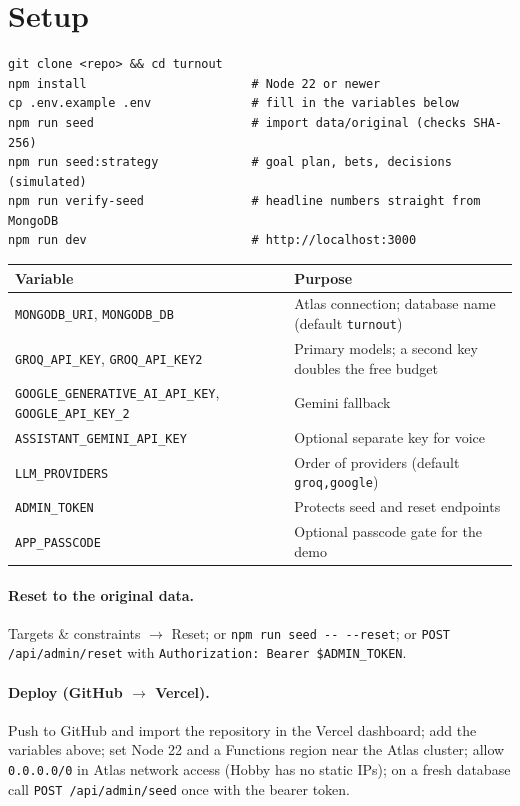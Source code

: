 \documentclass[11pt,a4paper]{article}
\newcommand{\code}[1]{\texttt{#1}}
\begin{document}
\section{Setup}\label{sec:setup}
\begin{verbatim}
git clone <repo> && cd turnout
npm install                       # Node 22 or newer
cp .env.example .env              # fill in the variables below
npm run seed                      # import data/original (checks SHA-256)
npm run seed:strategy             # goal plan, bets, decisions (simulated)
npm run verify-seed               # headline numbers straight from MongoDB
npm run dev                       # http://localhost:3000
\end{verbatim}

{\small\begin{tabularx}{\linewidth}{@{}p{6.4cm}L@{}}
\toprule
\textbf{Variable} & \textbf{Purpose} \\
\midrule
\code{MONGODB\_URI}, \code{MONGODB\_DB} & Atlas connection; database name (default \code{turnout}) \\
\code{GROQ\_API\_KEY}, \code{GROQ\_API\_KEY2} & Primary models; a second key doubles the free budget \\
\code{GOOGLE\_GENERATIVE\_AI\_API\_KEY}, \newline \code{GOOGLE\_API\_KEY\_2} & Gemini fallback \\
\code{ASSISTANT\_GEMINI\_API\_KEY} & Optional separate key for voice \\
\code{LLM\_PROVIDERS} & Order of providers (default \code{groq,google}) \\
\code{ADMIN\_TOKEN} & Protects seed and reset endpoints \\
\code{APP\_PASSCODE} & Optional passcode gate for the demo \\
\bottomrule
\end{tabularx}}

\paragraph{Reset to the original data.} Targets \& constraints $\to$ Reset; or \code{npm run seed -{}- -{}-reset}; or \code{POST /api/admin/reset} with \code{Authorization: Bearer \$ADMIN\_TOKEN}.

\paragraph{Deploy (GitHub $\to$ Vercel).} Push to GitHub and import the repository in the Vercel dashboard; add the variables above; set Node 22 and a Functions region near the Atlas cluster; allow \code{0.0.0.0/0} in Atlas network access (Hobby has no static IPs); on a fresh database call \code{POST /api/admin/seed} once with the bearer token.
\end{document}
